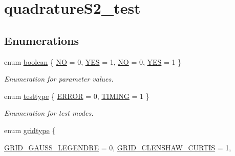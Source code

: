 \hypertarget{group__applications__quadratureS2__test}{
\section{quadratureS2\_\-test}
\label{group__applications__quadratureS2__test}
}
\subsection*{Enumerations}
\begin{CompactItemize}
\item 
enum \hyperlink{group__applications__quadratureS2__test_g7c6368b321bd9acd0149b030bb8275ed}{boolean} \{ \hyperlink{group__applications__quadratureS2__test_gg7c6368b321bd9acd0149b030bb8275ed0d077f5b932ce05e5b9f30c6087a2f31}{NO} =  0, 
\hyperlink{group__applications__quadratureS2__test_gg7c6368b321bd9acd0149b030bb8275ed99f136a862ba5c7d16967231c29f09d6}{YES} =  1, 
\hyperlink{group__applications__quadratureS2__test_gg7c6368b321bd9acd0149b030bb8275ed0d077f5b932ce05e5b9f30c6087a2f31}{NO} =  0, 
\hyperlink{group__applications__quadratureS2__test_gg7c6368b321bd9acd0149b030bb8275ed99f136a862ba5c7d16967231c29f09d6}{YES} =  1
 \}
\begin{CompactList}\small\item\em Enumeration for parameter values. \item\end{CompactList}\item 
enum \hyperlink{group__applications__quadratureS2__test_g47f3fd319121e75dc73cd720c536f3c7}{testtype} \{ \hyperlink{group__applications__quadratureS2__test_gg47f3fd319121e75dc73cd720c536f3c72fd6f336d08340583bd620a7f5694c90}{ERROR} =  0, 
\hyperlink{group__applications__quadratureS2__test_gg47f3fd319121e75dc73cd720c536f3c75a8494507ee46d4de19eff42f3cfb29e}{TIMING} =  1
 \}
\begin{CompactList}\small\item\em Enumeration for test modes. \item\end{CompactList}\item 
enum \hyperlink{group__applications__quadratureS2__test_g4cf30b0362e85bc0154ca2c52b2bc17e}{gridtype} \{ \par
\hyperlink{group__applications__quadratureS2__test_gg4cf30b0362e85bc0154ca2c52b2bc17e86eff666759be01b0b849e253ab7b8a4}{GRID\_\-GAUSS\_\-LEGENDRE} =  0, 
\hyperlink{group__applications__quadratureS2__test_gg4cf30b0362e85bc0154ca2c52b2bc17e782da8eac771ea12786694e472adc304}{GRID\_\-CLENSHAW\_\-CURTIS} =  1, 

\end{CompactItemize}
